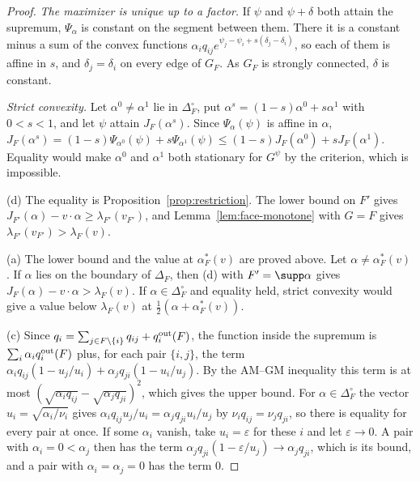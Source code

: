 \begin{proof}
\emph{The maximizer is unique up to a factor.} If $\psi$ and $\psi+\delta$ both
attain the supremum, $\Psi_\alpha$ is constant on the segment between them. There
it is a constant minus a sum of the convex functions
$\alpha_iq_{ij}e^{\psi_j-\psi_i+s(\delta_j-\delta_i)}$, so each of them is affine
in $s$, and $\delta_j=\delta_i$ on every edge of $G_F$. As $G_F$ is strongly
connected, $\delta$ is constant.

\emph{Strict convexity.} Let $\alpha^0\ne\alpha^1$ lie in $\Delta_F^\circ$, put
$\alpha^s=(1-s)\alpha^0+s\alpha^1$ with $0<s<1$, and let $\psi$ attain
$J_F(\alpha^s)$. Since $\Psi_\alpha(\psi)$ is affine in $\alpha$,
$J_F(\alpha^s)=(1-s)\Psi_{\alpha^0}(\psi)+s\Psi_{\alpha^1}(\psi)\le(1-s)J_F(\alpha^0)+sJ_F(\alpha^1)$.
Equality would make $\alpha^0$ and $\alpha^1$ both stationary for $G^\psi$ by the
criterion, which is impossible.

(d) The equality is Proposition~\ref{prop:restriction}. The lower bound on $F'$
gives $J_{F'}(\alpha)-v\cdot\alpha\ge\lambda_{F'}(v_{F'})$, and
Lemma~\ref{lem:face-monotone} with $G=F$ gives $\lambda_{F'}(v_{F'})>\lambda_F(v)$.

(a) The lower bound and the value at $\alpha^*_F(v)$ are proved above. Let
$\alpha\ne\alpha^*_F(v)$. If $\alpha$ lies on the boundary of $\Delta_F$, then (d)
with $F'=\supp\alpha$ gives $J_F(\alpha)-v\cdot\alpha>\lambda_F(v)$. If
$\alpha\in\Delta_F^\circ$ and equality held, strict convexity would give a value
below $\lambda_F(v)$ at $\frac12(\alpha+\alpha^*_F(v))$.

(c) Since $q_i=\sum_{j\in F\setminus\{i\}}q_{ij}+q_i^{\rm out}(F)$, the function
inside the supremum is $\sum_i\alpha_iq_i^{\rm out}(F)$ plus, for each pair
$\{i,j\}$, the term $\alpha_iq_{ij}(1-u_j/u_i)+\alpha_jq_{ji}(1-u_i/u_j)$. By the
AM--GM inequality this term is at most
$(\sqrt{\alpha_iq_{ij}}-\sqrt{\alpha_jq_{ji}})^2$, which gives the upper bound. For
$\alpha\in\Delta_F^\circ$ the vector $u_i=\sqrt{\alpha_i/\nu_i}$ gives
$\alpha_iq_{ij}u_j/u_i=\alpha_jq_{ji}u_i/u_j$ by $\nu_iq_{ij}=\nu_jq_{ji}$, so there is
equality for every pair at once. If some $\alpha_i$ vanish, take $u_i=\varepsilon$
for these $i$ and let $\varepsilon\to0$. A pair with $\alpha_i=0<\alpha_j$ then has
the term $\alpha_jq_{ji}(1-\varepsilon/u_j)\to\alpha_jq_{ji}$, which is its bound, and
a pair with $\alpha_i=\alpha_j=0$ has the term $0$.
\end{proof}

